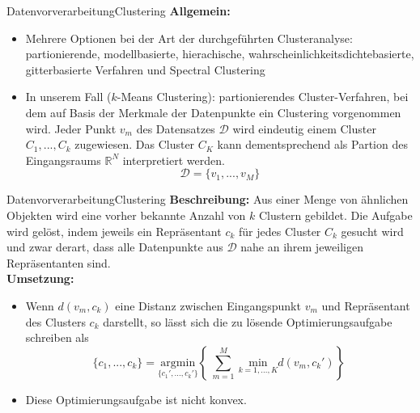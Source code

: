 \documentclass[169, handout	]{THIbeamer} %
\begin{document}
	\begin{frame}{Datenvorverarbeitung}{Clustering}
		\textbf{Allgemein:}
		\begin{itemize}
			\item Mehrere Optionen bei der Art der durchgeführten Clusteranalyse: partionierende, modellbasierte, hierachische, wahrscheinlichkeitsdichtebasierte, gitterbasierte Verfahren und Spectral Clustering
			\item In unserem Fall ($k$-Means Clustering): partionierendes Cluster-Verfahren, bei dem auf Basis der Merkmale der Datenpunkte ein Clustering vorgenommen wird. Jeder Punkt  $v_m$ des Datensatzes $\mathcal{D}$ wird eindeutig einem Cluster $C_1, ..., C_k$ zugewiesen. Das Cluster $C_K$ kann dementsprechend als Partion des Eingangsraums $\mathbb{R}^N$ interpretiert werden.
			\begin{equation}
				\mathcal{D} = \{v_1, ..., v_M \}
			\end{equation}
	\end{itemize}
	\end{frame}
	\begin{frame}{Datenvorverarbeitung}{Clustering}
		\textbf{Beschreibung:} Aus einer Menge von ähnlichen Objekten wird eine vorher bekannte Anzahl von $k$ Clustern gebildet. Die Aufgabe wird gelöst, indem jeweils ein Repräsentant $c_k$ für jedes Cluster $C_k$ gesucht wird und zwar derart, dass alle Datenpunkte aus $\mathcal{D}$ nahe an ihrem jeweiligen Repräsentanten sind. \\
		\textbf{Umsetzung:} 
		\begin{itemize}
			\item Wenn $d(v_m, c_k)$ eine Distanz zwischen Eingangspunkt $v_m$ und Repräsentant des Clusters $c_k$ darstellt, so lässt sich die zu lösende Optimierungsaufgabe schreiben als
			\begin{equation}
				\{c_1, ..., c_k\}  = \underset{\{c_1',...,c_k'\}}{\mathrm{argmin}} \left\{\ \sum_{m=1}^M\ \underset{k=1, ...,K}{\mathrm{min}} d(v_m, c_k') \right\}\
			\end{equation}
			\item Diese Optimierungsaufgabe ist nicht konvex.
		\end{itemize}
 	\end{frame}
\end{document}
